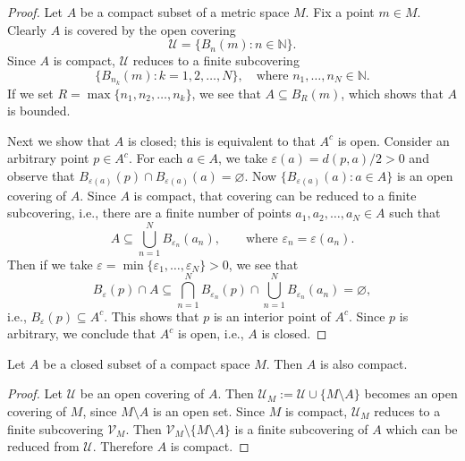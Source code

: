 \begin{proof}
  Let $A$ be a compact subset of a metric space $M$.
  Fix a point $m \in M$.  Clearly $A$ is covered by the open covering
  \[
    \mathcal{U} = \{ B_n(m) \colon n \in \mathbb{N} \}.
  \]
  Since $A$ is compact, $\mathcal{U}$ reduces to a finite subcovering
  \[
    \{ B_{n_k}(m) \colon k = 1, 2, \dots, N \}, \quad \text{where $n_1, \dots, n_N \in \mathbb{N}$.}
  \]
  If we set $R = \max \{ n_1, n_2, \dots, n_k \}$, we see that $A \subseteq B_R(m)$, which shows that $A$ is bounded.

  Next we show that $A$ is closed; this is equivalent to that $A^c$ is open.
  Consider an arbitrary point $p \in A^c$.
  For each $a \in A$, we take $\varepsilon(a) = d(p,a)/2 > 0$ and observe that $B_{\varepsilon(a)}(p) \cap B_{\varepsilon(a)}(a) = \varnothing$.
  Now $\{ B_{\varepsilon(a)}(a) \colon a \in A \}$ is an open covering of $A$.
  Since $A$ is compact, that covering can be reduced to a finite subcovering, i.e., there are a finite number of points $a_1, a_2, \dots, a_N \in A$ such that
  \[
      A \subseteq \bigcup_{n=1}^N B_{\varepsilon_n}(a_n), \qquad \text{where } \varepsilon_n = \varepsilon(a_n).
  \]
  Then if we take $\varepsilon = \min \{ \varepsilon_1, \dots, \varepsilon_N \} > 0$, we see that
  \[
    B_{\varepsilon}(p) \cap A
    \subseteq \bigcap_{n=1}^N B_{\varepsilon_n}(p) \cap \bigcup_{n=1}^N B_{\varepsilon_n}(a_n) = \varnothing,
  \]
  i.e., $B_{\varepsilon}(p) \subseteq A^c$.
  This shows that $p$ is an interior point of $A^c$.
  Since $p$ is arbitrary, we conclude that $A^c$ is open, i.e., $A$ is closed.
\end{proof}

\begin{thm}
  Let $A$ be a closed subset of a compact space $M$.
  Then $A$ is also compact.
\end{thm}

\begin{proof}
  Let $\mathcal{U}$ be an open covering of $A$.
  Then $\mathcal{U}_M := \mathcal{U} \cup \{ M \setminus A\}$ becomes an open covering of $M$, since $M \setminus A$ is an open set.
  Since $M$ is compact, $\mathcal{U}_M$ reduces to a finite subcovering $\mathcal{V}_M$.
  Then $\mathcal{V}_M \setminus \{ M \setminus A \}$ is a finite subcovering of $A$ which can be reduced from $\mathcal{U}$.
  Therefore $A$ is compact.
\end{proof}
